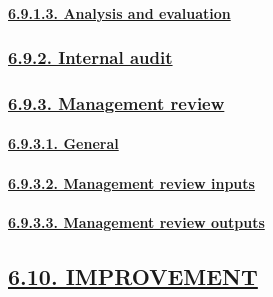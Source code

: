 \documentclass[
]{article}
\begin{document}
\hypertarget{analysis-and-evaluation}{%
\paragraph{\texorpdfstring{\protect\hyperlink{analysis-and-evaluation-1}{6.9.1.3.
Analysis and
evaluation}}{6.9.1.3. Analysis and evaluation}}\label{analysis-and-evaluation}}

\hypertarget{internal-audit}{%
\subsubsection{\texorpdfstring{\protect\hyperlink{internal-audit-1}{6.9.2.
Internal audit}}{6.9.2. Internal audit}}\label{internal-audit}}

\hypertarget{management-review}{%
\subsubsection{\texorpdfstring{\protect\hyperlink{management-review-1}{6.9.3.
Management review}}{6.9.3. Management review}}\label{management-review}}

\hypertarget{general-7}{%
\paragraph{\texorpdfstring{\protect\hyperlink{general-16}{6.9.3.1.
General}}{6.9.3.1. General}}\label{general-7}}

\hypertarget{management-review-inputs}{%
\paragraph{\texorpdfstring{\protect\hyperlink{management-review-inputs-1}{6.9.3.2.
Management review
inputs}}{6.9.3.2. Management review inputs}}\label{management-review-inputs}}

\hypertarget{management-review-outputs}{%
\paragraph{\texorpdfstring{\protect\hyperlink{management-review-outputs-1}{6.9.3.3.
Management review
outputs}}{6.9.3.3. Management review outputs}}\label{management-review-outputs}}

\hypertarget{improvement}{%
\subsection{\texorpdfstring{\protect\hyperlink{improvement-1}{6.10.
IMPROVEMENT}}{6.10. IMPROVEMENT}}\label{improvement}}
\end{document}
